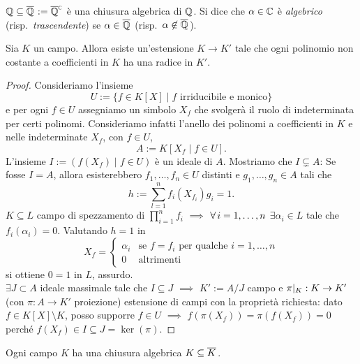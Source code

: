 \begin{esem}
\(\Q\subseteq\calg{\Q}:=\calg[\C]{\Q}\) è una chiusura algebrica di \(\Q\). Si dice che \(\alpha\in\C\) è {\em algebrico} (risp.\ {\em trascendente}) se \(\alpha\in\calg{\Q}\) (risp.\ \(\alpha\not\in\calg{\Q}\)).
\end{esem}

\begin{lemm}
Sia \(K\) un campo. Allora esiste un'estensione \(K \to K'\) tale che ogni polinomio non costante a coefficienti in \(K\) ha una radice in \(K'\).
\end{lemm}

\begin{proof}
Consideriamo l'insieme 
\[U:=\{f \in K[X] \mid f \text{ irriducibile e monico}\}\]
e per ogni \(f \in U\) assegniamo un simbolo \(X_f\) che svolgerà il ruolo di indeterminata per certi polinomi. Consideriamo infatti l'anello dei polinomi a coefficienti in \(K\) e nelle indeterminate \(X_f\), con \(f \in U\), 
\[A:=K\left[X_f \mid f \in U\right] .\]
 L'insieme \(I:= \left(f(X_f) \mid f\in U\right)\) è un ideale di \(A\). Mostriamo che \(I \subsetneq A\): Se fosse \(I = A\), allora esisterebbero \(f_1, \dots{}, f_n \in U\) distinti e \(g_1,\dots,g_n\in A\) tali che
\[ h:=\sum_{l=1}^nf_i\left(X_{f_i}\right)g_i=1. \]
\(K\subseteq L\) campo di spezzamento di \(\prod_{i=1}^nf_i\) \(\implies\) \(\all i=1,\dots,n\) \(\exi\alpha_i\in L\) tale che \(f_i(\alpha_i)=0\). Valutando \(h=1\) in
\[
X_f=
\begin{cases}
\alpha_i & \text{se \(f=f_i\) per qualche \(i=1,\dots,n\)} \\
0 & \text{altrimenti}  
\end{cases}
\]
si ottiene \(0=1\) in \(L\), assurdo. \\
\(\exi J\subset A\) ideale massimale tale che \(I\subseteq J\) \(\implies\) \(K':=A/J\) campo e \(\pi\rest{K} : K\to K'\) (con \(\pi : A\to K'\) proiezione) estensione di campi con la propriet\`a richiesta: dato \(f\in K[X]\setminus K\), posso supporre \(f\in U\) \(\implies\) \(f(\pi(X_f))=\pi(f(X_f))=0\) perché \(f(X_f)\in I\subseteq J=\ker(\pi)\).
\end{proof}

\begin{teor}
Ogni campo \(K\) ha una chiusura algebrica \(K\subseteq\calg{K}\).
\end{teor}

